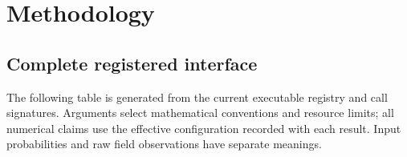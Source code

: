 \documentclass[
  english,
  11pt,
]{article}
\begin{document}
\section{Methodology}\label{sec:methodology}

\subsection{Complete registered
interface}\label{complete-registered-interface}

The following table is generated from the current executable registry
and call signatures. Arguments select mathematical conventions and
resource limits; all numerical claims use the effective configuration
recorded with each result. Input probabilities and raw field
observations have separate meanings.
\end{document}
